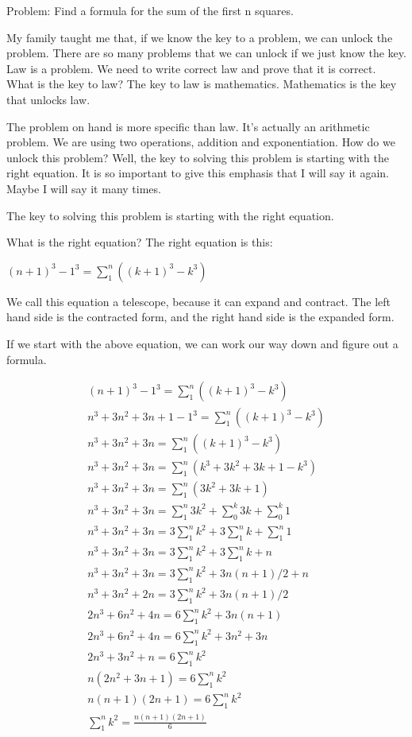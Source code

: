 Problem: Find a formula for the sum of the first n squares.

My family taught me that, if we know the key to a problem, we can unlock the problem. There are so many problems that we can unlock if we just know the key. Law is a problem. We need to write correct law and prove that it is correct. What is the key to law? The key to law is mathematics. Mathematics is the key that unlocks law.

The problem on hand is more specific than law. It's actually an arithmetic problem. We are using two operations, addition and exponentiation. How do we unlock this problem? Well, the key to solving this problem is starting with the right equation. It is so important to give this emphasis that I will say it again. Maybe I will say it many times.

The key to solving this problem is starting with the right equation.

What is the right equation? The right equation is this:

$(n+1)^3 - 1^3 = \sum_1^n ((k+1)^3 - k^3)$

We call this equation a telescope, because it can expand and contract. The left hand side is the contracted form, and the right hand side is the expanded form.

If we start with the above equation, we can work our way down and figure out a formula.

\begin{align*}
(n+1)^3 - 1^3 = \sum_1^n ((k+1)^3 - k^3) \\
n^3 + 3n^2 + 3n + 1 - 1^3 = \sum_1^n ((k+1)^3 - k^3) \\
n^3 + 3n^2 + 3n = \sum_1^n ((k+1)^3 - k^3) \\
n^3 + 3n^2 + 3n = \sum_1^n (k^3 + 3k^2 + 3k + 1 - k^3) \\
n^3 + 3n^2 + 3n = \sum_1^n (3k^2 + 3k + 1) \\
n^3 + 3n^2 + 3n = \sum_1^n 3k^2 + \sum_0^k 3k + \sum_0^k 1 \\
n^3 + 3n^2 + 3n = 3 \sum_1^n k^2 + 3 \sum_1^n k + \sum_1^n 1 \\
n^3 + 3n^2 + 3n = 3 \sum_1^n k^2 + 3 \sum_1^n k + n \\
n^3 + 3n^2 + 3n = 3 \sum_1^n k^2 + 3n(n+1)/2 + n \\
n^3 + 3n^2 + 2n = 3 \sum_1^n k^2 + 3n(n+1)/2 \\
2n^3 + 6n^2 + 4n = 6 \sum_1^n k^2 + 3n(n+1) \\
2n^3 + 6n^2 + 4n = 6 \sum_1^n k^2 + 3n^2 + 3n \\
2n^3 + 3n^2 + n = 6 \sum_1^n k^2 \\
n(2n^2 + 3n + 1) = 6 \sum_1^n k^2 \\
n(n + 1)(2n + 1) = 6 \sum_1^n k^2 \\
\sum_1^n k^2 = \frac{n(n + 1)(2n + 1)}{6} \\
\end{align*}

